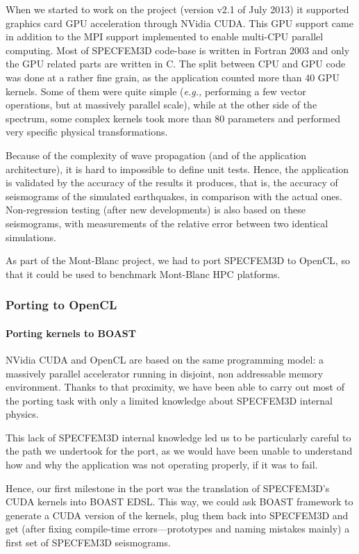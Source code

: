 \documentclass{IEEEtran}
\newcommand{\latin}[1]{\textit{#1}}
\newcommand{\eg}{\latin{e.g.,}\xspace}
\begin{document}
When we started to work on the project (version v2.1 of July 2013) it
supported graphics card GPU acceleration through NVidia CUDA. This
GPU support came in addition to the MPI support implemented to enable
multi-CPU parallel computing. Most of SPECFEM3D code-base is written in
Fortran 2003 and only the GPU related parts are written in
C.  The split between CPU and GPU code was done at a rather fine
grain, as the application counted more than 40 GPU kernels. Some of
them were quite simple (\eg performing a few vector operations, but at
massively parallel scale), while at the other side of the spectrum,
some complex kernels took more than 80 parameters and performed very
specific physical transformations.

Because of the complexity of wave propagation (and of the application
architecture), it is hard to impossible to define unit tests. Hence,
the application is validated by the accuracy of the results it
produces, that is, the accuracy of seismograms of the simulated
earthquakes, in comparison with the actual ones. Non-regression
testing (after new developments) is also based on these seismograms,
with measurements of the relative error between two identical
simulations.

As part of the Mont-Blanc project, we had to port SPECFEM3D to OpenCL, so
that it could be used to benchmark Mont-Blanc HPC platforms.

\subsubsection{Porting to OpenCL}

\paragraph{Porting kernels to BOAST}  NVidia CUDA and OpenCL are based on the same programming model: a
massively parallel accelerator running in disjoint, non addressable
memory environment. Thanks to that proximity, we have been able to carry
out most of the porting task with only a limited knowledge about
SPECFEM3D internal physics.

This lack of SPECFEM3D internal knowledge led us to be particularly
careful to the path we undertook for the port, as we would have
been unable to understand how and why the application was not
operating properly, if it was to fail.

Hence, our first milestone in the port was the translation of
SPECFEM3D's CUDA kernels into BOAST EDSL. This way, we could ask BOAST
framework to generate a CUDA version of the kernels, plug them back
into SPECFEM3D and get (after fixing compile-time errors---prototypes
and naming mistakes mainly) a first set of SPECFEM3D seismograms.
\end{document}
